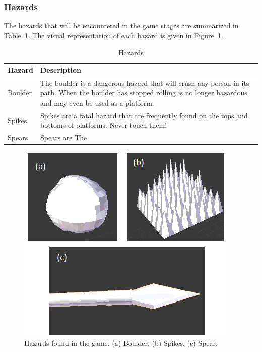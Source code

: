 \documentclass[12pt, titlepage]{article}
\begin{document}
\subsubsection{Hazards}
The hazards that will be encountered in the game stages are summarized in \hyperref[tab:hazards]{Table~\ref*{tab:hazards}}.  The visual representation of each hazard is given in \hyperref[fig:hazards]{Figure~\ref*{fig:hazards}}.

\begin{table}[H]
\caption{Hazards} \label{tab:hazards}
\renewcommand{\arraystretch}{1.2}
\begin{tabularx}{\textwidth}{p{4cm}X}
\toprule {\bf Hazard} & {\bf Description}\\
\midrule
Boulder & The boulder is a dangerous hazard that will crush any person in its path.  When the boulder has stopped rolling is no longer hazardous and may even be used as a platform.\\
Spikes & Spikes are a fatal hazard that are frequently found on the tops and bottoms of platforms.  Never touch them! \\
Spears & Spears are  The\\
\bottomrule
\end{tabularx}
\end{table}

\begin{figure}[H]
\begin{center}
\includegraphics[width=\textwidth]{hazards}
\caption[Hazards found in the game.]{Hazards found in the game.  (a) Boulder. (b) Spikes. (c) Spear.} \label{fig:hazards}
\end{center}
\end{figure}
\end{document}
